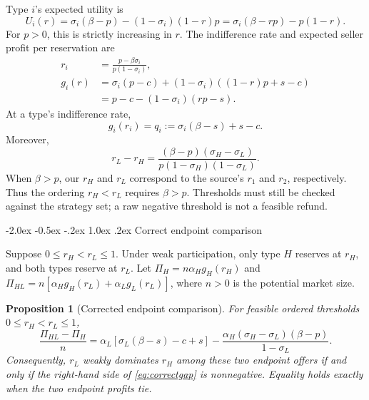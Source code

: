 \documentclass[12pt]{article}
\makeatletter
\newtheorem{proposition}{Proposition}
\renewcommand\section{\@startsection{section}{1}{\z@}%
  {-2.0ex \@plus -0.5ex \@minus -.2ex}%
  {1.0ex \@plus .2ex}%
  {\centering\normalfont\bfseries\fontsize{14}{16}\selectfont}}
\makeatother
\begin{document}
Type $i$'s expected utility is
\begin{equation}
 U_i(r)=\sigma_i(\beta-p)-(1-\sigma_i)(1-r)p
       =\sigma_i(\beta-rp)-p(1-r).
 \label{eq:utility}
\end{equation}
For $p>0$, this is strictly increasing in $r$. The indifference rate and expected seller profit per reservation are
\begin{align}
 r_i&=\frac{p-\beta\sigma_i}{p(1-\sigma_i)},
 \label{eq:threshold}\\
 g_i(r)&=\sigma_i(p-c)+(1-\sigma_i)((1-r)p+s-c)\\
       &=p-c-(1-\sigma_i)(rp-s).
 \label{eq:unitprofit}
\end{align}
At a type's indifference rate,
\begin{equation}
 g_i(r_i)=q_i:=\sigma_i(\beta-s)+s-c.
 \label{eq:q}
\end{equation}
Moreover,
\begin{equation}
 r_L-r_H=\frac{(\beta-p)(\sigma_H-\sigma_L)}{p(1-\sigma_H)(1-\sigma_L)}.
 \label{eq:thresholdgap}
\end{equation}
When $\beta>p$, our $r_H$ and $r_L$ correspond to the source's $r_1$ and $r_2$, respectively. Thus the ordering $r_H<r_L$ requires $\beta>p$. Thresholds must still be checked against the strategy set; a raw negative threshold is not a feasible refund.

\section{Correct endpoint comparison}

Suppose $0\leq r_H<r_L\leq1$. Under weak participation, only type $H$ reserves at $r_H$, and both types reserve at $r_L$. Let $\Pi_H=n\alpha_Hg_H(r_H)$ and $\Pi_{HL}=n[\alpha_Hg_H(r_L)+\alpha_Lg_L(r_L)]$, where $n>0$ is the potential market size.

\begin{proposition}[Corrected endpoint comparison]
\label{prop:corrected}
For feasible ordered thresholds $0\leq r_H<r_L\leq1$,
\begin{equation}
 \frac{\Pi_{HL}-\Pi_H}{n}
 =\alpha_L[\sigma_L(\beta-s)-c+s]
 -\frac{\alpha_H(\sigma_H-\sigma_L)(\beta-p)}{1-\sigma_L}.
 \label{eq:correctgap}
\end{equation}
Consequently, $r_L$ weakly dominates $r_H$ among these two endpoint offers if and only if the right-hand side of \eqref{eq:correctgap} is nonnegative. Equality holds exactly when the two endpoint profits tie.
\end{proposition}
\end{document}
